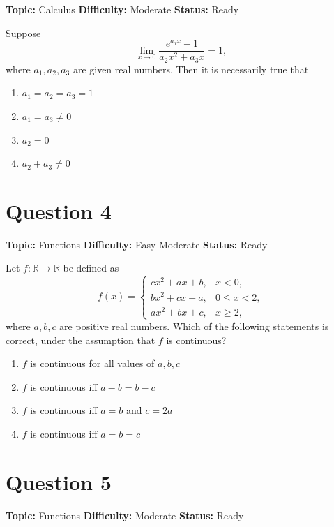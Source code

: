 \documentclass[11pt]{article}
\begin{document}
\noindent\textbf{Topic:} Calculus \quad \textbf{Difficulty:} Moderate \quad \textbf{Status:} Ready



Suppose
\[
\lim_{x\to 0}\frac{e^{a_1 x}-1}{a_2 x^{2}+a_3 x}=1,
\]
where $a_1,a_2,a_3$ are given real numbers. Then it is necessarily true that
\begin{enumerate}[label=(\Alph*)]
\item $a_1=a_2=a_3=1$
\item $a_1=a_3\ne 0$
\item $a_2=0$
\item $a_2+a_3\ne 0$
\end{enumerate}

\newpage

\section*{Question 4}


\noindent\textbf{Topic:} Functions \quad \textbf{Difficulty:} Easy-Moderate \quad \textbf{Status:} Ready



Let $f:\mathbb{R}\to\mathbb{R}$ be defined as
\[
f(x)=\begin{cases}
cx^{2}+ax+b, & x<0,\\
bx^{2}+cx+a, & 0\le x<2,\\
ax^{2}+bx+c, & x\ge 2,
\end{cases}
\]
where $a,b,c$ are positive real numbers. Which of the following statements is correct, under the assumption that $f$ is continuous?
\begin{enumerate}[label=(\Alph*)]
\item $f$ is continuous for all values of $a,b,c$
\item $f$ is continuous iff $a-b=b-c$
\item $f$ is continuous iff $a=b$ and $c=2a$
\item $f$ is continuous iff $a=b=c$
\end{enumerate}

\newpage

\section*{Question 5}


\noindent\textbf{Topic:} Functions \quad \textbf{Difficulty:} Moderate \quad \textbf{Status:} Ready
\end{document}
